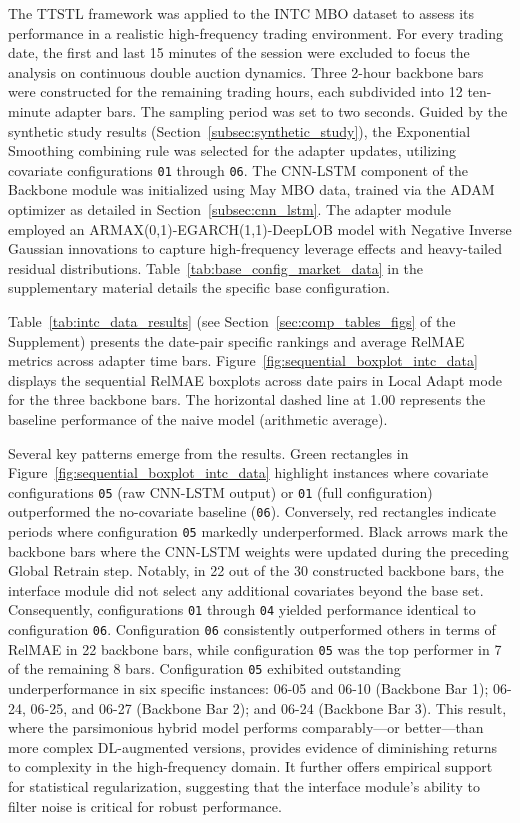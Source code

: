 \documentclass[10pt,a4paper,oneside]{article}
\begin{document}
The TTSTL framework was applied to the INTC MBO dataset to assess its performance in a realistic high-frequency trading environment. For every trading date, the first and last 15 minutes of the session were excluded to focus the analysis on continuous double auction dynamics. Three 2-hour backbone bars were constructed for the remaining trading hours, each subdivided into 12 ten-minute adapter bars. The sampling period was set to two seconds. Guided by the synthetic study results (Section~\ref{subsec:synthetic_study}), the Exponential Smoothing combining rule was selected for the adapter updates, utilizing covariate configurations \texttt{01} through \texttt{06}. The CNN-LSTM component of the Backbone module was initialized using May MBO data, trained via the ADAM optimizer as detailed in Section~\ref{subsec:cnn_lstm}. The adapter module employed an ARMAX(0,1)-EGARCH(1,1)-DeepLOB model with Negative Inverse Gaussian innovations to capture high-frequency leverage effects and heavy-tailed residual distributions. Table~\ref{tab:base_config_market_data} in the supplementary material details the specific base configuration.

Table~\ref{tab:intc_data_results} (see Section~\ref{sec:comp_tables_figs} of the Supplement) presents the date-pair specific rankings and average RelMAE metrics across adapter time bars. Figure~\ref{fig:sequential_boxplot_intc_data} displays the sequential RelMAE boxplots across date pairs in Local Adapt mode for the three backbone bars. The horizontal dashed line at 1.00 represents the baseline performance of the naive model (arithmetic average).

Several key patterns emerge from the results. Green rectangles in Figure~\ref{fig:sequential_boxplot_intc_data} highlight instances where covariate configurations \texttt{05} (raw CNN-LSTM output) or \texttt{01} (full configuration) outperformed the no-covariate baseline (\texttt{06}). Conversely, red rectangles indicate periods where configuration \texttt{05} markedly underperformed. Black arrows mark the backbone bars where the CNN-LSTM weights were updated during the preceding Global Retrain step. Notably, in 22 out of the 30 constructed backbone bars, the interface module did not select any additional covariates beyond the base set. Consequently, configurations \texttt{01} through \texttt{04} yielded performance identical to configuration \texttt{06}. Configuration \texttt{06} consistently outperformed others in terms of RelMAE in 22 backbone bars, while configuration \texttt{05} was the top performer in 7 of the remaining 8 bars. Configuration \texttt{05} exhibited outstanding underperformance in six specific instances: 06-05 and 06-10 (Backbone Bar 1); 06-24, 06-25, and 06-27 (Backbone Bar 2); and 06-24 (Backbone Bar 3). This result, where the parsimonious hybrid model performs comparably—or better—than more complex DL-augmented versions, provides evidence of diminishing returns to complexity in the high-frequency domain. It further offers empirical support for statistical regularization, suggesting that the interface module's ability to filter noise is critical for robust performance.
\end{document}
